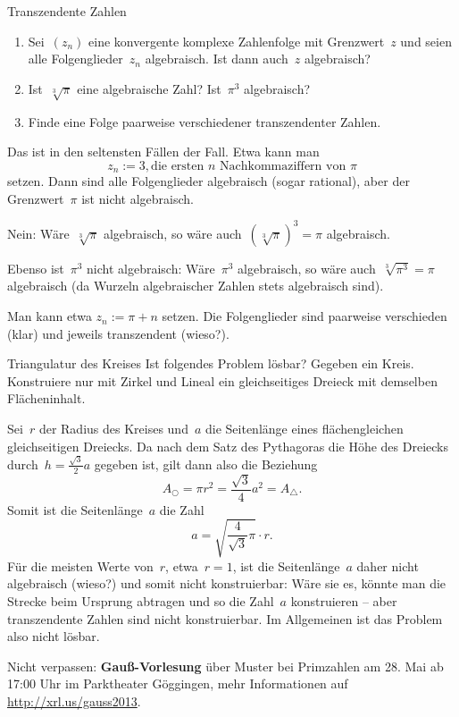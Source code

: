 \documentclass{algblatt}
\begin{document}
\begin{aufgabe}{Transzendente Zahlen}
\begin{enumerate}
\item Sei~$(z_n)$ eine konvergente komplexe Zahlenfolge mit Grenzwert~$z$ und
seien alle Folgenglieder~$z_n$ algebraisch. Ist dann auch~$z$ algebraisch?
\item Ist~$\sqrt[3]{\pi}$ eine algebraische Zahl? Ist~$\pi^3$ algebraisch?
\item Finde eine Folge paarweise verschiedener transzendenter Zahlen.
\end{enumerate}

\begin{loesungE}
\item Das ist in den seltensten Fällen der Fall. Etwa kann man
\[ z_n := 3{,}\text{die ersten~$n$ Nachkommaziffern von~$\pi$} \]
setzen. Dann sind alle Folgenglieder algebraisch (sogar rational), aber der
Grenzwert~$\pi$ ist nicht algebraisch.

\item Nein: Wäre~$\sqrt[3]{\pi}$ algebraisch, so wäre auch~$(\sqrt[3]{\pi})^3 =
\pi$ algebraisch.

Ebenso ist~$\pi^3$ nicht algebraisch: Wäre~$\pi^3$ algebraisch, so wäre
auch~$\sqrt[3]{\pi^3} = \pi$ algebraisch (da Wurzeln algebraischer Zahlen stets
algebraisch sind).

\item Man kann etwa $z_n := \pi + n$ setzen. Die Folgenglieder sind paarweise
verschieden (klar) und jeweils transzendent (wieso?).
\end{loesungE}
\end{aufgabe}

\begin{aufgabe}{Triangulatur des Kreises}
Ist folgendes Problem lösbar? Gegeben ein Kreis. Konstruiere nur mit Zirkel und
Lineal ein gleichseitiges Dreieck mit demselben Flächeninhalt.

\begin{loesung}
Sei~$r$ der Radius des Kreises und~$a$ die Seitenlänge eines flächengleichen
gleichseitigen Dreiecks. Da nach dem Satz des Pythagoras die Höhe des Dreiecks
durch~$h = \frac{\sqrt{3}}{2} a$ gegeben ist, gilt dann also die Beziehung
\[ A_\bigcirc = \pi r^2 = \frac{\sqrt{3}}{4} a^2 = A_\triangle. \]
Somit ist die Seitenlänge~$a$ die Zahl
\[ a = \sqrt{\frac{4}{\sqrt{3}} \pi} \cdot r. \]
Für die meisten Werte von~$r$, etwa~$r = 1$, ist die Seitenlänge~$a$ daher
nicht algebraisch (wieso?) und somit nicht konstruierbar: Wäre sie es, könnte
man die Strecke beim Ursprung abtragen und so die Zahl~$a$ konstruieren -- aber
transzendente Zahlen sind nicht konstruierbar. Im Allgemeinen ist das Problem
also nicht lösbar.
\end{loesung}
\end{aufgabe}

Nicht verpassen: \textbf{Gauß-Vorlesung} über Muster bei Primzahlen am 28. Mai
ab 17:00 Uhr im Parktheater Göggingen, mehr Informationen auf
\url{http://xrl.us/gauss2013}.
 
\end{document}
